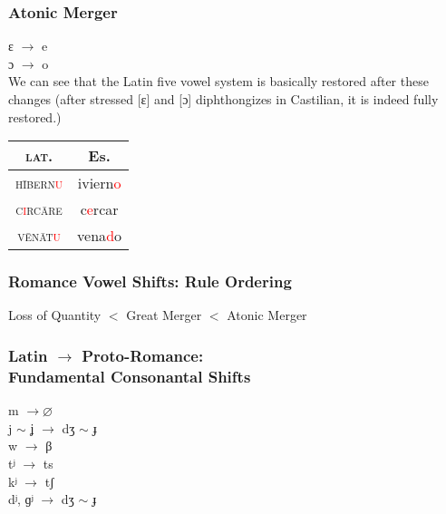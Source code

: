 \documentclass{beamer}
\begin{document}
\begin{frame}
	\frametitle{Atonic Merger}

	ɛ $\rightarrow$ e \\
	ɔ $\rightarrow$ o \\
	We can see that the Latin five vowel system is basically restored after these changes (after stressed [ɛ] and [ɔ] diphthongizes in Castilian, it is indeed fully restored.)
\end{frame}

\begin{frame}
	\begin{center}
		\begin{tabular}{c c}
			\textsc{lat.}                            & Es.                      \\
			\hline
			\textsc{h\={i}bern\textcolor{red}{u}}    & iviern\textcolor{red}{o} \\
			\textsc{c\textcolor{red}{i}rc\={a}re}    & c\textcolor{red}{e}rcar  \\
			\textsc{v\={e}n\={a}t\textcolor{red}{u}} & vena\textcolor{red}d{o}  \\
		\end{tabular}
	\end{center}
\end{frame}

\begin{frame}
	\frametitle{Romance Vowel Shifts: Rule Ordering}

	Loss of Quantity $<$ Great Merger $<$ Atonic Merger
\end{frame}

\begin{frame}
	\frametitle{Latin $\rightarrow$ Proto-Romance: \\ Fundamental Consonantal Shifts}

	m $\rightarrow \varnothing$ \\
	j $\sim$ ʝ $\rightarrow$ dʒ $\sim$ ɟ \\
	w $\rightarrow$ β \\
	tʲ $\rightarrow$ ts \\
	kʲ $\rightarrow$ tʃ \\
	dʲ, ɡʲ $\rightarrow$ dʒ $\sim$ ɟ
\end{frame}
\end{document}
